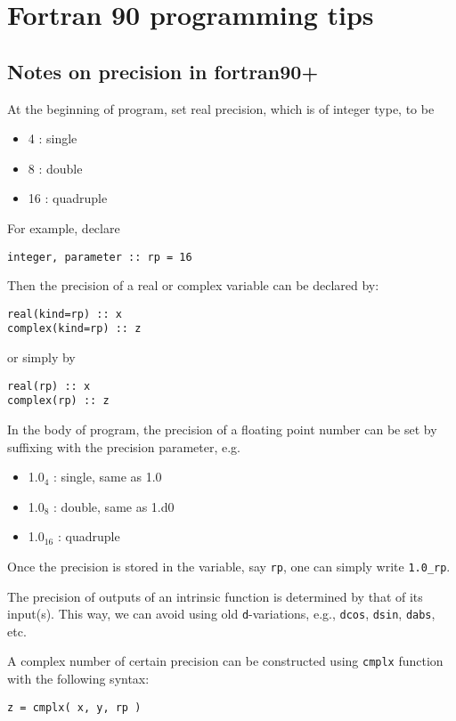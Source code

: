 \documentclass[11pt]{article}
\begin{document}
\section{Fortran 90 programming tips}
\label{sec:org8a43dbf}
\subsection{Notes on precision in fortran90+}
\label{sec:orgbb99309}
At the beginning of program, set real precision, which is of integer type, to be
\begin{itemize}
\item 4 : single
\item 8 : double
\item 16 : quadruple
\end{itemize}
For example, declare
\begin{verbatim}
integer, parameter :: rp = 16
\end{verbatim}

Then the precision of a real or complex variable can be declared by:
\begin{verbatim}
real(kind=rp) :: x
complex(kind=rp) :: z
\end{verbatim}
or simply by
\begin{verbatim}
real(rp) :: x
complex(rp) :: z
\end{verbatim}

In the body of program, the precision of a floating point number can be set by suffixing with the precision parameter, e.g.
\begin{itemize}
\item 1.0\(_{\text{4}}\) : single, same as 1.0
\item 1.0\(_{\text{8}}\) : double, same as 1.d0
\item 1.0\(_{\text{16}}\) : quadruple
\end{itemize}
Once the precision is stored in the variable, say  \texttt{rp}, one can simply write \texttt{1.0\_rp}.

The precision of outputs of an intrinsic function is determined by that of its input(s). This way, we can avoid using old \texttt{d}-variations, e.g., \texttt{dcos}, \texttt{dsin}, \texttt{dabs}, etc.

A complex number of certain precision can be constructed using \texttt{cmplx} function with the following syntax:
\begin{verbatim}
z = cmplx( x, y, rp )
\end{verbatim}
\end{document}
